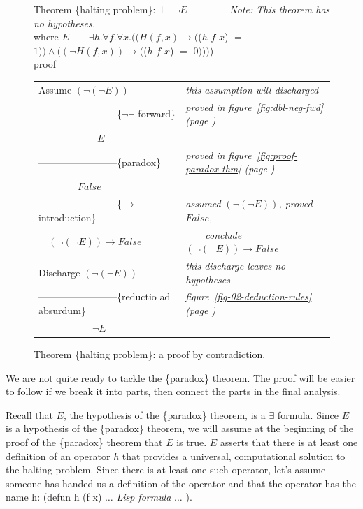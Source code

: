 \begin{figure}
Theorem \{halting problem\}: $\vdash$ $\neg E$ ~~~~~~~~\emph{Note: This theorem has no hypotheses.}\\
\hspace*{5mm}where $E$ $\equiv$ $\exists h. \forall f. \forall x.
((H(f, x) \rightarrow ($\textsf{($h$ $f$ $x$)} $=$ $1)) \wedge ((\neg H(f, x)) \rightarrow ($\textsf{($h$ $f$ $x$)} $=$ $0)))$)\\
proof
\begin{center}
\begin{tabular}{ll}
Assume $(\neg(\neg E))$                       &\emph{this assumption will discharged}\\
------------------------\{$\neg \neg$ forward\} &\emph{proved in figure~\ref{fig:dbl-neg-fwd} (page \pageref{fig:dbl-neg-fwd})}\\
~~~~~~~~~~~~$E$                               &\\
------------------------\{paradox\}           &\emph{proved in figure~\ref{fig:proof-paradox-thm} (page \pageref{fig:proof-paradox-thm})}\\
~~~~~~~~$False$                               &\\
------------------------\{$\rightarrow$ introduction\} &\emph{assumed} $(\neg(\neg E))$\emph{, proved} $False$\emph{,}\\
~~$(\neg(\neg E)) \rightarrow False$          &~~~~\emph{conclude} $(\neg(\neg E)) \rightarrow False$\\
Discharge $(\neg(\neg E))$                    &\emph{this discharge leaves no hypotheses}\\
------------------------\{reductio ad absurdum\}&\emph{figure~\ref{fig-02-deduction-rules} (page \pageref{fig-02-deduction-rules})}\\
~~~~~~~~~~~$\neg E$                           &\\
\end{tabular}
\end{center}
\caption{Theorem \{halting problem\}: a proof by contradiction.}
\label{fig:halting-proof-strategy}
\end{figure}

We are not quite ready to tackle the \{paradox\} theorem.
The proof will be easier to follow if we break it into parts,
then connect the parts in the final analysis.

Recall that $E$, the hypothesis of the \{paradox\} theorem,
is a $\exists$ formula.
Since $E$ is a hypothesis of the \{paradox\} theorem,
we will assume at the beginning of the proof
of the \{paradox\} theorem that $E$ is true.
$E$ asserts that there is at least one definition of
an operator $h$ that provides a universal, computational solution
to the halting problem.
Since there is at least one such operator,
let's assume someone has handed us a
definition of the operator and that the operator has the name \textsf{h}:
\textsf{(defun h (f x)}  $\dots$ \emph{Lisp formula} $\dots$ \textsf{)}.

